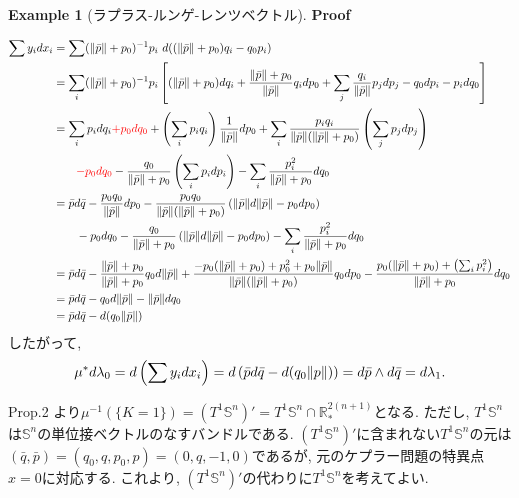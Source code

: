 \documentclass[a4paper]{ujarticle}
\makeatletter
\newcommand{\red}[1]{\textcolor{red}{#1}} %
\numberwithin{equation}{section}
\theoremstyle{definition}
\newtheorem{example}{Example}
\renewenvironment{proof}[1][Proof]{\par
  \pushQED{\qed}%
  \normalfont \topsep6\p@\@plus6\p@\relax
  \trivlist
  \item\relax
  {\bfseries
  #1\@addpunct{.}}\hspace\labelsep\ignorespaces
}{%
  \popQED\endtrivlist\@endpefalse
}
\makeatother
\begin{document}
\begin{example}[ラプラス-ルンゲ-レンツベクトル]
\begin{proof}
\begin{enumerate}[(i)]
                    \begin{align}
                        \sum y_i dx_i &= \sum (\norm{\bar{p}} + p_0)^{-1} p_i \ d ((\norm{\bar{p}} + p_0) q_i - q_0 p_i) \\
                        &= \sum_{i} (\norm{\bar{p}} + p_0)^{-1} p_i \left[ (\norm{\bar{p}} + p_0) d q_i + \frac{\norm{\bar{p}} + p_0}{\norm{\bar{p}}} q_i d p_0 + \sum_{j}\frac{q_i}{\norm{\bar{p}}} p_j d p_j - q_0 d p_i - p_i d q_0 \right] \\
                        &= \sum_{i} p_i d q_i  \red{+ p_0 d q_0} + \left(\sum_{i}  p_i q_i\right) \frac{1}{\norm{\bar{p}}}d p_0 + \sum_{i} \frac{p_i q_i}{\norm{\bar{p}}(\norm{\bar{p}} + p_0)}\left(\sum_{j} p_j d p_j\right) \\
                        & \quad \quad \red{- p_0 d q_0}  - \frac{q_0}{\norm{\bar{p}} + p_0} \left(\sum_{i} p_i d p_i\right) - \sum_{i} \frac{p_i^2}{\norm{\bar{p}} + p_0} d q_0 \\
                        &= \bar{p} d \bar{q} -\frac{p_0 q_0}{\norm{\bar{p}}}d p_0 - \frac{p_0 q_0}{\norm{\bar{p}}(\norm{\bar{p}} + p_0)}\left(\norm{\bar{p}} d \norm{\bar{p}} - p_0 d p_0\right) \\
                        &\quad \quad - p_0 d q_0 - \frac{q_0}{\norm{\bar{p}} + p_0} \left(\norm{\bar{p}} d \norm{\bar{p}} - p_0 d p_0\right) - \sum_{i} \frac{p_i^2}{\norm{\bar{p}} + p_0} d q_0 \\
                        &=  \bar{p} d \bar{q} - \frac{\norm{\bar{p}} + p_0}{\norm{\bar{p}} + p_0} q_0 d \norm{\bar{p}} + \frac{- p_0 (\norm{\bar{p}} + p_0) + p_0^2 + p_0 \norm{\bar{p}}}{\norm{\bar{p}}(\norm{\bar{p}} + p_0)}q_0 d p_0 
                         - \frac{p_0(\norm{\bar{p}} + p_0) + \left(\sum_{i} p_i^2 \right)}{\norm{\bar{p}} + p_0}d q_0 \\
                        &= \bar{p} d\bar{q} - q_0 d \norm{\bar{p}} - \norm{\bar{p}}d q_0 \\
                        &= \bar{p} d\bar{q} - d (q_0 \norm{\bar{p}})
                    \end{align}
                    したがって, 
                    \[
                        \mu^{*} d \lambda_0 = d \left(\sum y_i d x_i\right) = d \left(\bar{p} d \bar{q} - d(q_0 \norm{p})\right) = d \bar{p} \wedge d\bar{q} = d \lambda_1.
                    \]
                \end{enumerate}
            \end{proof}

            Prop.2 より$\mu^{-1}(\{K = 1\}) = (T^{1} \mathbb{S}^n)' = T^{1} \mathbb{S}^n \cap \mathbb{R}^{2(n+1)}_{*}$となる.
            ただし, $T^{1} \mathbb{S}^{n}$は$\mathbb{S}^{n}$の単位接ベクトルのなすバンドルである.
            $(T^{1} \mathbb{S}^{n})'$に含まれない$T^{1} \mathbb{S}^{n}$の元は$(\bar{q}, \bar{p}) = (q_0, q, p_0, p) = (0, q, -1, 0)$であるが, 
            元のケプラー問題の特異点$x = 0$に対応する.
            これより, $(T^{1} \mathbb{S}^{n})'$の代わりに$T^{1} \mathbb{S}^{n}$を考えてよい.


\end{example}
\end{document}
